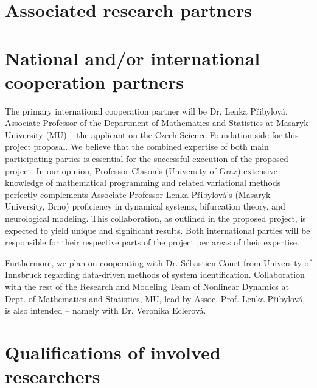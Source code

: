 \documentclass[a4paper,11pt]{scrartcl}
\begin{document}
\section{Associated research partners}\label{sec:partners}


\section{National and/or international cooperation partners}\label{sec:cooperations}


The primary international cooperation partner will be Dr. Lenka Přibylová, Associate Professor of the Department of Mathematics and Statistics at Masaryk University (MU) -- the applicant on the Czech Science Foundation side for this project proposal. We believe that the combined expertise of both main participating parties is essential for the successful execution of the proposed project. In our opinion, Professor Clason's (University of Graz) extensive knowledge of mathematical programming and related variational methods perfectly complements Associate Professor Lenka Přibylová's (Masaryk University, Brno) proficiency in dynamical systems, bifurcation theory, and neurological modeling. This collaboration, as outlined in the proposed project, is expected to yield unique and significant results. Both international parties will be responsible for their respective parts of the project per areas of their expertise.

Furthermore, we plan on cooperating with Dr. Sébastien Court from University of Innsbruck regarding data-driven methods of system identification. Collaboration with the rest of the Research and Modeling Team of Nonlinear Dynamics at Dept. of Mathematics and Statistics, MU, lead by Assoc. Prof. Lenka Přibylová, is also intended -- namely with Dr. Veronika Eclerová.


\section{Qualifications of involved researchers}\label{sec:qualifications}

\end{document}
